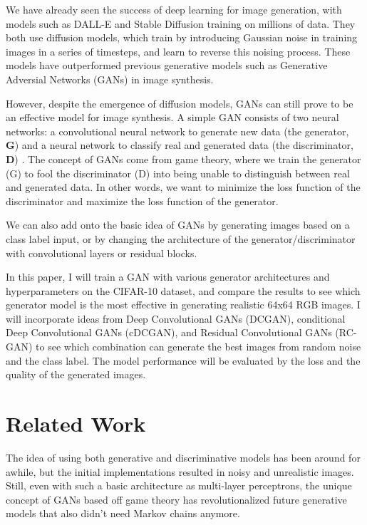 \documentclass[twoside,11pt]{article}
\begin{document}
We have already seen the success of deep learning for image generation, with models such as DALL-E and Stable Diffusion training on millions of data. They both use diffusion models, which train by introducing Gaussian noise in training images in a series of timesteps, and learn to reverse this noising process. These models have outperformed previous generative models such as Generative Adversial Networks (GANs) in image synthesis.

However, despite the emergence of diffusion models, GANs can still prove to be an effective model for image synthesis. A simple GAN consists of two neural networks: a convolutional neural network to generate new data (the generator, \textbf{G}) and a neural network to classify real and generated data (the discriminator, \textbf{D}) \citet{brownlee:19}. The concept of GANs come from game theory, where we train the generator (G) to fool the discriminator (D) into being unable to distinguish between real and generated data. In other words, we want to minimize the loss function of the discriminator and maximize the loss function of the generator.

We can also add onto the basic idea of GANs by generating images based on a class label input, or by changing the architecture of the generator/discriminator with convolutional layers or residual blocks.

In this paper, I will train a GAN with various generator architectures and hyperparameters on the CIFAR-10 dataset, and compare the results to see which generator model is the most effective in generating realistic 64x64 RGB images. I will incorporate ideas from Deep Convolutional GANs (DCGAN), conditional Deep Convolutional GANs (cDCGAN), and Residual Convolutional GANs (RC-GAN) to see which combination can generate the best images from random noise and the class label. The model performance will be evaluated by the loss and the quality of the generated images.

\section{Related Work}

The idea of using both generative and discriminative models \citet{goodfellow:14} has been around for awhile, but the initial implementations resulted in noisy and unrealistic images. Still, even with such a basic architecture as multi-layer perceptrons, the unique concept of GANs based off game theory has revolutionalized future generative models that also didn't need Markov chains anymore.
\end{document}
